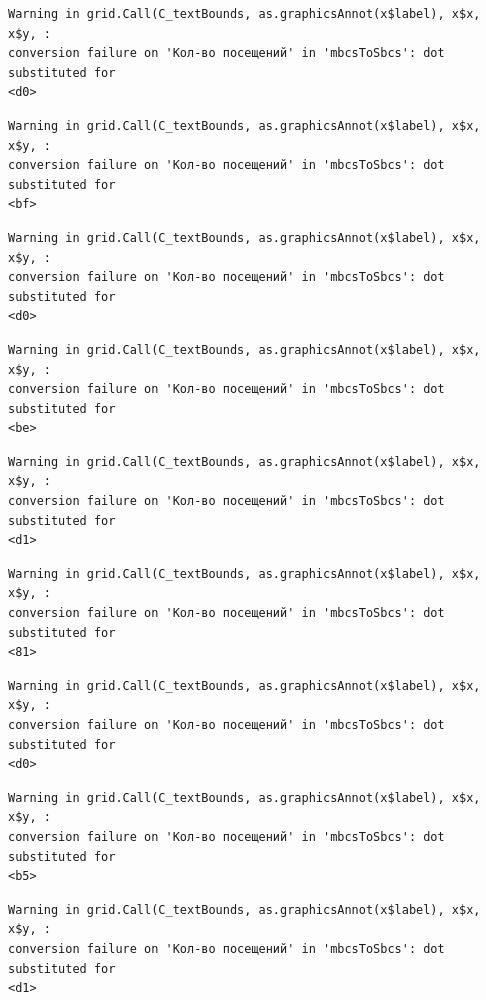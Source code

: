 \documentclass[
  letterpaper,
  DIV=11,
  numbers=noendperiod]{scrartcl}
\begin{document}
\begin{verbatim}
Warning in grid.Call(C_textBounds, as.graphicsAnnot(x$label), x$x, x$y, :
conversion failure on 'Кол-во посещений' in 'mbcsToSbcs': dot substituted for
<d0>
\end{verbatim}

\begin{verbatim}
Warning in grid.Call(C_textBounds, as.graphicsAnnot(x$label), x$x, x$y, :
conversion failure on 'Кол-во посещений' in 'mbcsToSbcs': dot substituted for
<bf>
\end{verbatim}

\begin{verbatim}
Warning in grid.Call(C_textBounds, as.graphicsAnnot(x$label), x$x, x$y, :
conversion failure on 'Кол-во посещений' in 'mbcsToSbcs': dot substituted for
<d0>
\end{verbatim}

\begin{verbatim}
Warning in grid.Call(C_textBounds, as.graphicsAnnot(x$label), x$x, x$y, :
conversion failure on 'Кол-во посещений' in 'mbcsToSbcs': dot substituted for
<be>
\end{verbatim}

\begin{verbatim}
Warning in grid.Call(C_textBounds, as.graphicsAnnot(x$label), x$x, x$y, :
conversion failure on 'Кол-во посещений' in 'mbcsToSbcs': dot substituted for
<d1>
\end{verbatim}

\begin{verbatim}
Warning in grid.Call(C_textBounds, as.graphicsAnnot(x$label), x$x, x$y, :
conversion failure on 'Кол-во посещений' in 'mbcsToSbcs': dot substituted for
<81>
\end{verbatim}

\begin{verbatim}
Warning in grid.Call(C_textBounds, as.graphicsAnnot(x$label), x$x, x$y, :
conversion failure on 'Кол-во посещений' in 'mbcsToSbcs': dot substituted for
<d0>
\end{verbatim}

\begin{verbatim}
Warning in grid.Call(C_textBounds, as.graphicsAnnot(x$label), x$x, x$y, :
conversion failure on 'Кол-во посещений' in 'mbcsToSbcs': dot substituted for
<b5>
\end{verbatim}

\begin{verbatim}
Warning in grid.Call(C_textBounds, as.graphicsAnnot(x$label), x$x, x$y, :
conversion failure on 'Кол-во посещений' in 'mbcsToSbcs': dot substituted for
<d1>
\end{verbatim}
\end{document}

